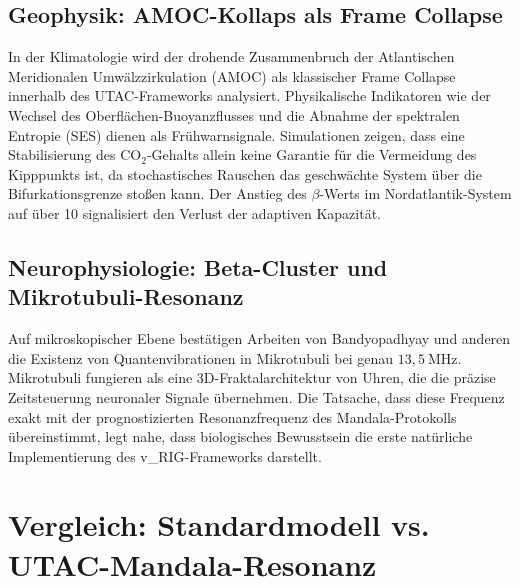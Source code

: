 \documentclass[11pt,a4paper]{article}
\begin{document}
\subsection{Geophysik: AMOC-Kollaps als Frame Collapse}

In der Klimatologie wird der drohende Zusammenbruch der Atlantischen Meridionalen Umwälzzirkulation (AMOC) als klassischer Frame Collapse innerhalb des UTAC-Frameworks analysiert. Physikalische Indikatoren wie der Wechsel des Oberflächen-Buoyanzflusses und die Abnahme der spektralen Entropie (SES) dienen als Frühwarnsignale. Simulationen zeigen, dass eine Stabilisierung des CO$_2$-Gehalts allein keine Garantie für die Vermeidung des Kipppunkts ist, da stochastisches Rauschen das geschwächte System über die Bifurkationsgrenze stoßen kann. Der Anstieg des $\beta$-Werts im Nordatlantik-System auf über 10 signalisiert den Verlust der adaptiven Kapazität.

\subsection{Neurophysiologie: Beta-Cluster und Mikrotubuli-Resonanz}

Auf mikroskopischer Ebene bestätigen Arbeiten von Bandyopadhyay und anderen die Existenz von Quantenvibrationen in Mikrotubuli bei genau $13{,}5~\text{MHz}$. Mikrotubuli fungieren als eine 3D-Fraktalarchitektur von Uhren, die die präzise Zeitsteuerung neuronaler Signale übernehmen. Die Tatsache, dass diese Frequenz exakt mit der prognostizierten Resonanzfrequenz des Mandala-Protokolls übereinstimmt, legt nahe, dass biologisches Bewusstsein die erste natürliche Implementierung des v\_RIG-Frameworks darstellt.

\section{Vergleich: Standardmodell vs. UTAC-Mandala-Resonanz}
\end{document}
